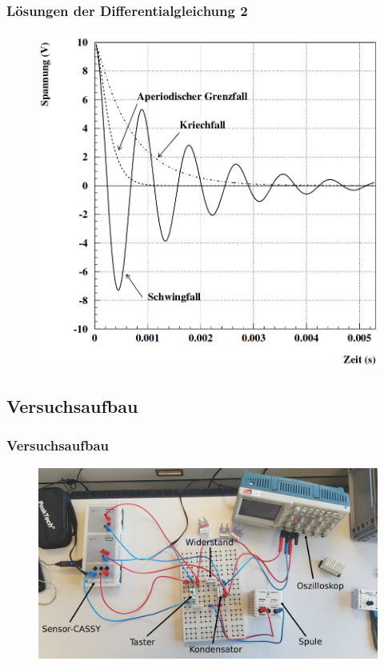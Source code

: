 \documentclass{beamer}
\begin{document}
\begin{frame}
\frametitle{Lösungen der Differentialgleichung 2}
\begin{figure}
\includegraphics[scale = 0.25]{abbildungen/typen_schwingung.png}
\end{figure}
\end{frame}


\subsection{Versuchsaufbau}

\begin{frame}
\frametitle{Versuchsaufbau}
\begin{figure}
\includegraphics[width=\linewidth]{abbildungen/LCR_aufbau_beschriftet.jpg}
\end{figure}
\end{frame}
\end{document}
